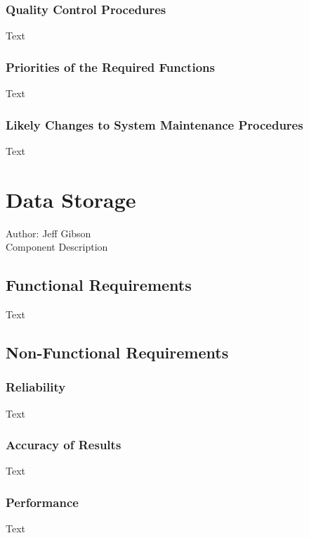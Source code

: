 \documentclass[12pt]{article}
\begin{document}
\subsubsection {Quality Control Procedures}

Text

\subsubsection {Priorities of the Required Functions}

Text

\subsubsection {Likely Changes to System Maintenance Procedures}

Text

\section{Data Storage}
Author: Jeff Gibson\\

\noindent Component Description

\subsection{Functional Requirements}

Text

\subsection{Non-Functional Requirements}

\subsubsection {Reliability}

Text

\subsubsection {Accuracy of Results}
 
Text

\subsubsection {Performance}

Text
\end{document}
